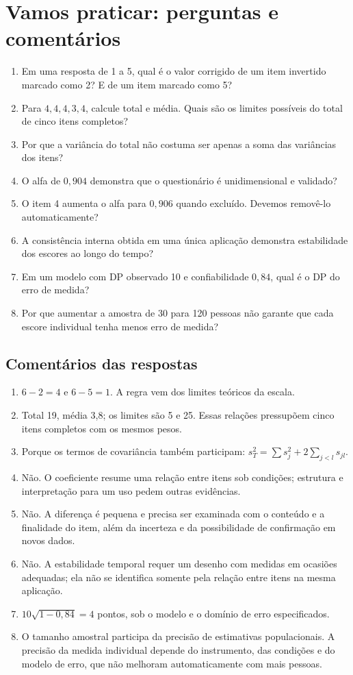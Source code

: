 \section{Vamos praticar: perguntas e comentários}

\begin{enumerate}
  \item Em uma resposta de 1 a 5, qual é o valor corrigido de um item invertido marcado como 2? E de um item marcado como 5?
  \item Para $4,4,4,3,4$, calcule total e média. Quais são os limites possíveis do total de cinco itens completos?
  \item Por que a variância do total não costuma ser apenas a soma das variâncias dos itens?
  \item O alfa de $0{,}904$ demonstra que o questionário é unidimensional e validado?
  \item O item 4 aumenta o alfa para $0{,}906$ quando excluído. Devemos removê-lo automaticamente?
  \item A consistência interna obtida em uma única aplicação demonstra estabilidade dos escores ao longo do tempo?
  \item Em um modelo com DP observado 10 e confiabilidade $0{,}84$, qual é o DP do erro de medida?
  \item Por que aumentar a amostra de 30 para 120 pessoas não garante que cada escore individual tenha menos erro de medida?
\end{enumerate}

\subsection*{Comentários das respostas}

\begin{enumerate}
  \item $6-2=4$ e $6-5=1$. A regra vem dos limites teóricos da escala.
  \item Total 19, média 3,8; os limites são 5 e 25. Essas relações pressupõem cinco itens completos com os mesmos pesos.
  \item Porque os termos de covariância também participam: $s_T^2=\sum s_j^2+2\sum_{j<l}s_{jl}$.
  \item Não. O coeficiente resume uma relação entre itens sob condições; estrutura e interpretação para um uso pedem outras evidências.
  \item Não. A diferença é pequena e precisa ser examinada com o conteúdo e a finalidade do item, além da incerteza e da possibilidade de confirmação em novos dados.
  \item Não. A estabilidade temporal requer um desenho com medidas em ocasiões adequadas; ela não se identifica somente pela relação entre itens na mesma aplicação.
  \item $10\sqrt{1-0{,}84}=4$ pontos, sob o modelo e o domínio de erro especificados.
  \item O tamanho amostral participa da precisão de estimativas populacionais. A precisão da medida individual depende do instrumento, das condições e do modelo de erro, que não melhoram automaticamente com mais pessoas.
\end{enumerate}

